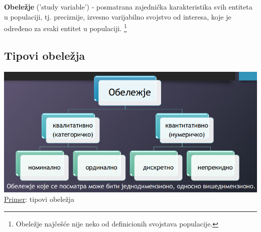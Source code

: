 \documentclass[10pt,a4paper,]{article}
\begin{document}
\textbf{Obeležje} ('study variable') - posmatrana zajednička 
karakteristika 
svih entiteta u populaciji, tj. preciznije, izvesno varijabilno 
svojstvo od interesa, koje je određeno za svaki entitet u populaciji.
\footnote{Obeležje najčešće nije neko od definicionih svojstava
populacije.}

\subsection{Tipovi obeležja}

\includegraphics[scale=0.4]{primer3}
\pagebreak
\\
\underline{Primer}: tipovi obeležja
\end{document}
